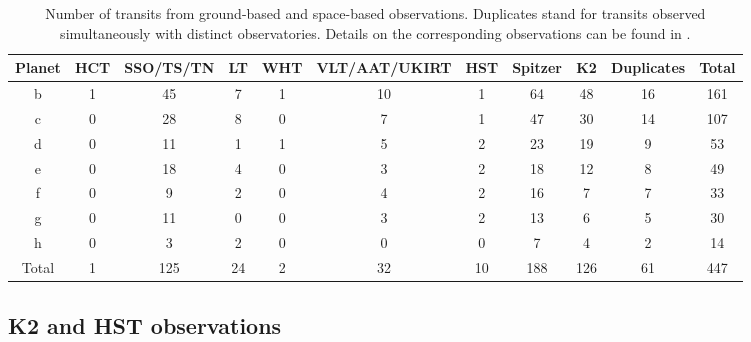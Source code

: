 \documentclass[twocolumn]{aastex63}
\begin{document}
\begin{table}
    \centering
    \begin{tabular}{c c c c c c c c c c c}
        \hline
        Planet & HCT & SSO/TS/TN & LT & WHT & VLT/AAT/UKIRT & HST & Spitzer & K2  & Duplicates & Total \\
        \hline
        b      & 1   & 45        & 7  & 1   & 10            & 1   & 64      & 48  & 16         & 161   \\
        c      & 0   & 28        & 8  & 0   & 7             & 1   & 47      & 30  & 14         & 107   \\
        d      & 0   & 11        & 1  & 1   & 5             & 2   & 23      & 19  & 9          & 53    \\
        e      & 0   & 18        & 4  & 0   & 3             & 2   & 18      & 12  & 8          & 49    \\
        f      & 0   & 9         & 2  & 0   & 4             & 2   & 16      & 7   & 7          & 33    \\
        g      & 0   & 11        & 0  & 0   & 3             & 2   & 13      & 6   & 5          & 30    \\
        h      & 0   & 3         & 2  & 0   & 0             & 0   & 7       & 4   & 2          & 14    \\
        \hline
        Total  & 1   & 125       & 24 & 2   & 32            & 10  & 188     & 126 & 61         & 447   \\
        \hline
    \end{tabular}
    \caption{Number of transits from ground-based and space-based observations. Duplicates stand for transits observed simultaneously with distinct observatories. Details on the corresponding observations can be found in \citet{Gillon2016,Gillon2017,Grimm2018,deWit2016,deWit2018,Delrez2018a,Ducrot2018,Burdanov2019,Ducrot2020}.}
    \label{tab:transit_time_list}
\end{table}

\subsection{K2 and HST observations}

\end{document}
